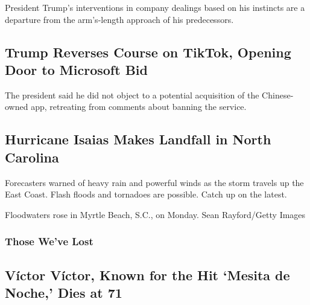 President Trump's interventions in company dealings based on his
instincts are a departure from the arm's-length approach of his
predecessors.

\href{/2020/08/03/technology/trump-tiktok-microsoft.html}{}

\hypertarget{trump-reverses-course-on-tiktok-opening-door-to-microsoft-bid}{%
\subsection{Trump Reverses Course on TikTok, Opening Door to Microsoft
Bid}\label{trump-reverses-course-on-tiktok-opening-door-to-microsoft-bid}}

The president said he did not object to a potential acquisition of the
Chinese-owned app, retreating from comments about banning the service.

\href{/2020/08/03/us/isaias-storm-updates.html}{}

\hypertarget{hurricane-isaias-makes-landfall-in-north-carolina}{%
\subsection{Hurricane Isaias Makes Landfall in North
Carolina}\label{hurricane-isaias-makes-landfall-in-north-carolina}}

Forecasters warned of heavy rain and powerful winds as the storm travels
up the East Coast. Flash floods and tornadoes are possible. Catch up on
the latest.

\href{/2020/08/03/us/isaias-storm-updates.html}{}

Floodwaters rose in Myrtle Beach, S.C., on Monday. Sean Rayford/Getty
Images

\hypertarget{those-weve-lost}{%
\subsubsection{Those We've Lost}\label{those-weve-lost}}

\href{/2020/08/01/obituaries/victor-victor-dead-coronavirus.html}{}

\hypertarget{vuxedctor-vuxedctor-known-for-the-hit-mesita-de-noche-dies-at-71}{%
\subsection{Víctor Víctor, Known for the Hit `Mesita de Noche,' Dies at
71}\label{vuxedctor-vuxedctor-known-for-the-hit-mesita-de-noche-dies-at-71}}

